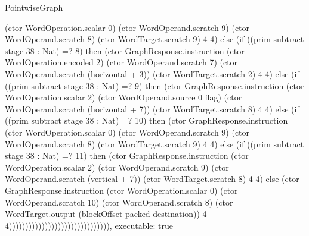 \begin{lexlean}{PointwiseGraph}
\begin{semanticmodule}
{(ctor WordOperation.scalar 0) (ctor WordOperand.scratch 9) (ctor WordOperand.scratch 8) (ctor WordTarget.scratch 9) 4 4) else (if ((prim subtract stage 38 : Nat) =? 8) then (ctor GraphResponse.instruction (ctor WordOperation.encoded 2) (ctor WordOperand.scratch 7) (ctor WordOperand.scratch (horizontal + 3)) (ctor WordTarget.scratch 2) 4 4) else (if ((prim subtract stage 38 : Nat) =? 9) then (ctor GraphResponse.instruction (ctor WordOperation.scalar 2) (ctor WordOperand.source 0 flag) (ctor WordOperand.scratch (horizontal + 7)) (ctor WordTarget.scratch 8) 4 4) else (if ((prim subtract stage 38 : Nat) =? 10) then (ctor GraphResponse.instruction (ctor WordOperation.scalar 0) (ctor WordOperand.scratch 9) (ctor WordOperand.scratch 8) (ctor WordTarget.scratch 9) 4 4) else (if ((prim subtract stage 38 : Nat) =? 11) then (ctor GraphResponse.instruction (ctor WordOperation.scalar 2) (ctor WordOperand.scratch 9) (ctor WordOperand.scratch (vertical + 7)) (ctor WordTarget.scratch 8) 4 4) else (ctor GraphResponse.instruction (ctor WordOperation.scalar 0) (ctor WordOperand.scratch 10) (ctor WordOperand.scratch 8) (ctor WordTarget.output (blockOffset packed destination)) 4 4))))))))))))))))))))))))))))))),
  executable: true
}


\end{semanticmodule}
\end{lexlean}

